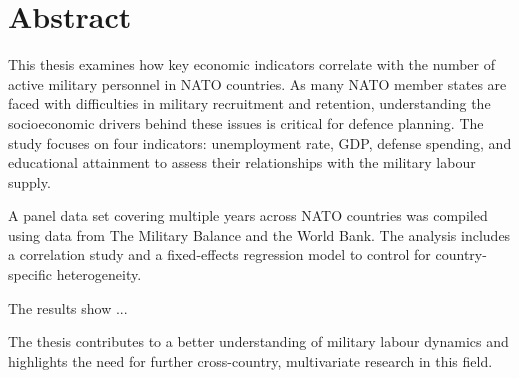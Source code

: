 \chapter*{Abstract}

This thesis examines how key economic indicators correlate with the number of active military personnel in NATO countries. As many NATO member states are faced
with difficulties in military recruitment and retention, understanding the socioeconomic
drivers behind these issues is critical for defence planning. 
The study focuses on four indicators: unemployment rate, GDP, defense spending, 
and educational attainment to assess their relationships with the military labour supply.

A panel data set covering multiple years across NATO countries was compiled using
data from The Military Balance and the World Bank. 
The analysis includes a correlation study and a 
fixed-effects regression model to control for country-specific heterogeneity.

The results show ...

The thesis contributes to a better understanding of military labour dynamics 
and highlights the need for further cross-country, 
multivariate research in this field.